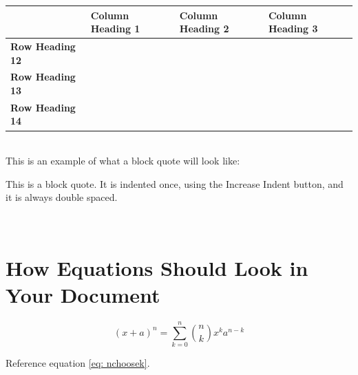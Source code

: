 \newpage
\begin{table}[htpb]
\begin{tabular}{l|l|l|l|}
\cline{2-4}
                                              & \textbf{Column Heading 1} & \textbf{Column Heading 2} & \textbf{Column Heading 3} \\ \hline
\multicolumn{1}{|l|}{\textbf{Row Heading 12}}  &                           &                           &                           \\ \hline
\multicolumn{1}{|l|}{\textbf{Row Heading 13}}  &                           &                           &                           \\ \hline
\multicolumn{1}{|l|}{\textbf{Row Heading 14}}  &                           &                           &                           \\ \hline

\end{tabular}
\end{table}
\FloatBarrier
\vspace{\baselineskip}

\lipsum[55] \\

\lipsum[42] This is an example of what a block quote will look like:

\begin{adjustwidth}{2.5em}{0pt}
This is a block quote. It is indented once, using the Increase Indent button, and it is always double spaced. \lipsum[1]
\end{adjustwidth}

\lipsum[21]\\
 
\lipsum[12]

\section{How Equations Should Look in Your Document}
\lipsum[1]

\begin{equation}\label{eq: nchoosek}
    (x+a)^n = \sum_{k = 0}^n \binom{n}{k} x^k a^{n-k}  
\end{equation}

\vspace{12pt}

Reference equation \ref{eq: nchoosek}. \lipsum[63]\\

\lipsum[62]

